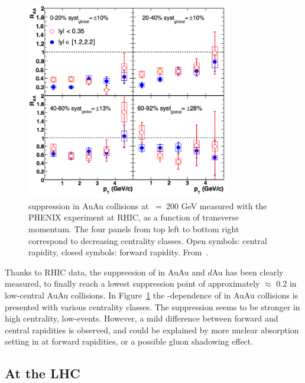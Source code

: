 \begin{figure}[th]
\begin{center}
  \includegraphics[width=0.8\textwidth]{Chapters/pQuarkonia/Phenix_raa_pt.png}
  \caption{\Jpsi suppression in AuAu collisions at \snn~=~200 GeV
    measured with the PHENIX experiment at RHIC, as a function of
    \Jpsi transverse momentum. The four panels from top left to bottom
    right correspond to decreasing centrality classes. Open symbols:
    central rapidity, closed symbols: forward rapidity. From~\cite{jpsiphenix}.}
  \label{fig:AuAuphenixpt}
\end{center}
\end{figure}


Thanks to RHIC data, the suppreesion of \Jpsi in AuAu and $d$Au has been
clearly measured, to finally reach a lowest suppression point of
approximately \RAA $\approx$ 0.2 in
 low-\pt central AuAu collisions. In Figure~\ref{fig:AuAuphenixpt} the
 \pt-dependence of \Jpsi in AuAu collisions is presented with various
 centrality classes. The suppression seems to be stronger in high centrality,
 low-\pt events. However, a mild difference between forward and
 central rapidities is observed, and could be explained by more
 nuclear absorption setting in at forward rapidities, or a
 possible gluon shadowing effect. 

\clearpage
\subsection{At the LHC}


